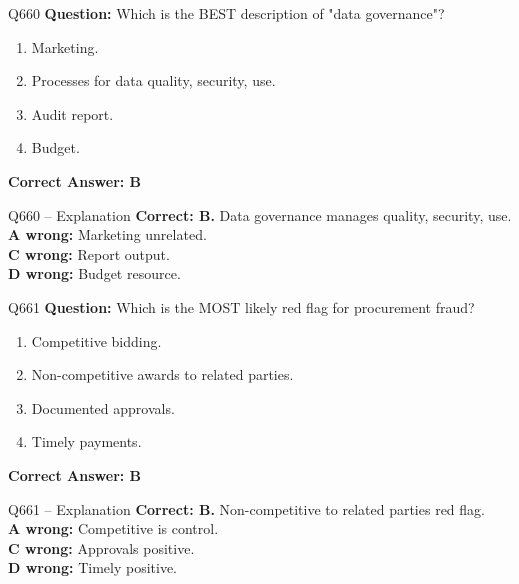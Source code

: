 \documentclass[aspectratio=169,10pt]{beamer}
\begin{document}
	\begin{frame}[t]{Q660}
		\small
		\textbf{Question:} Which is the BEST description of "data governance"?
		\begin{enumerate}[label=\Alph*.,itemsep=1pt,topsep=2pt]
			\item Marketing.
			\item Processes for data quality, security, use.
			\item Audit report.
			\item Budget.
		\end{enumerate}
		\vspace{4pt}
		\textbf{Correct Answer: B}
	\end{frame}
	
	\begin{frame}[t]{Q660 -- Explanation}
		\small
		\textbf{Correct: B.} Data governance manages quality, security, use. \\[4pt]
		\textbf{A wrong:} Marketing unrelated. \\[2pt]
		\textbf{C wrong:} Report output. \\[2pt]
		\textbf{D wrong:} Budget resource.
	\end{frame}
	
	\begin{frame}[t]{Q661}
		\small
		\textbf{Question:} Which is the MOST likely red flag for procurement fraud?
		\begin{enumerate}[label=\Alph*.,itemsep=1pt,topsep=2pt]
			\item Competitive bidding.
			\item Non-competitive awards to related parties.
			\item Documented approvals.
			\item Timely payments.
		\end{enumerate}
		\vspace{4pt}
		\textbf{Correct Answer: B}
	\end{frame}
	
	\begin{frame}[t]{Q661 -- Explanation}
		\small
		\textbf{Correct: B.} Non-competitive to related parties red flag. \\[4pt]
		\textbf{A wrong:} Competitive is control. \\[2pt]
		\textbf{C wrong:} Approvals positive. \\[2pt]
		\textbf{D wrong:} Timely positive.
	\end{frame}
	
\end{document}
